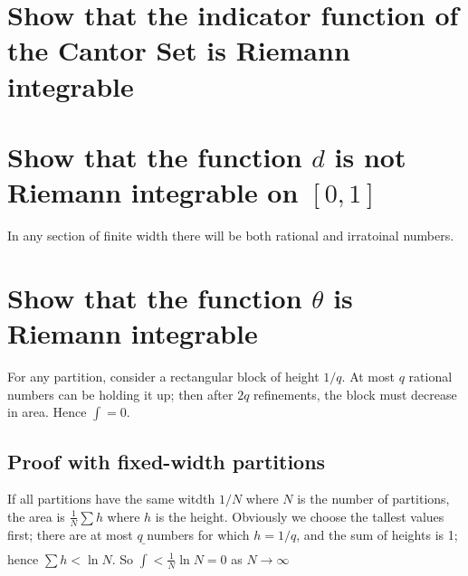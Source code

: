 \documentclass{article}
\begin{document}
\section{Show that the indicator function of the Cantor Set is Riemann integrable}

\section{Show that the function $d$ is not Riemann integrable on $[0,1]$}

In any section of finite width there will be both rational and irratoinal numbers.

\section{Show that the function $\theta$ is Riemann integrable}

For any partition, consider a rectangular block of height $1/q$. At most $q$ rational numbers can be holding it up; then after $2q$ refinements, the block must decrease in area. Hence $\int = 0$.

\subsection*{Proof with fixed-width partitions}

If all partitions have the same witdth $1/N$ where $N$ is the number of partitions, the area is $\frac{1}{N} \sum h$ where $h$ is the height. Obviously we choose the tallest values first; there are at most $q$ numbers for which $h = 1/q$, and the sum of heights is 1; hence $\sum h < \ln N$. So $\bar\int < \frac{1}{N} \ln N = 0$ as $N \rightarrow \infty$
\end{document}
